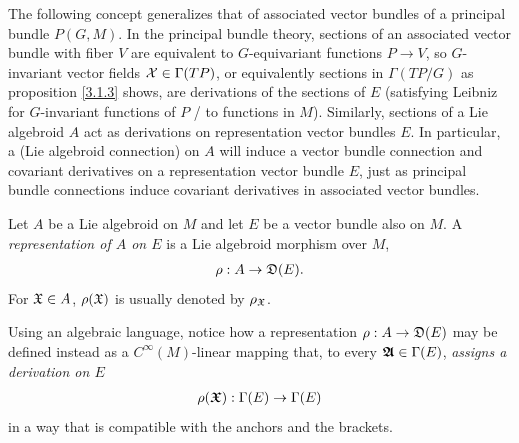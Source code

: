 

\linea

The following concept generalizes that of associated vector bundles of a principal bundle $P(G, M)$. In the principal bundle theory, sections of an associated vector bundle with fiber $V$ are equivalent to $G$-equivariant functions $P \to V$, so $G$-invariant vector fields $\mathcal{X} \in \Gamma(TP)$, or equivalently sections in $\Gamma(TP/G)$ as proposition \ref{3.1.3} shows, are derivations of the sections of $E$ (satisfying Leibniz for $G$-invariant functions of $P$ / to functions in $M$). Similarly, sections of a Lie algebroid $A$ act as derivations on representation vector bundles $E$. In particular, a (Lie algebroid connection) on $A$ will induce a vector bundle connection and covariant derivatives on a representation vector bundle $E$, just as principal bundle connections induce covariant derivatives in associated vector bundles.

\begin{definition}\label{defnRepr}
Let $A$ be a Lie algebroid on $M$ and let $E$ be a vector bundle also on $M$. A \emph{representation of $A$ on $E$} is a Lie algebroid morphism over $M$,
\begin{align}
    \rho: A \to \mathfrak{D}(E).
\end{align}
For $\mathfrak{X} \in A$, $\rho(\mathfrak{X})$ is usually denoted by $\rho_{\mathfrak{X}}$.
\end{definition}
Using an algebraic language, notice how a representation $\rho:A \to \mathfrak{D}(E)$ may be defined instead as a $C^\infty(M)$-linear mapping that, to every $\bm{\mathfrak{A}} \in \Gamma(E)$, \emph{assigns a derivation on $E$} 
\begin{align}
    \rho(\bm{\mathfrak{X}}): \Gamma(E) \to \Gamma(E)
\end{align}
in a way that is compatible with the anchors and the brackets.

